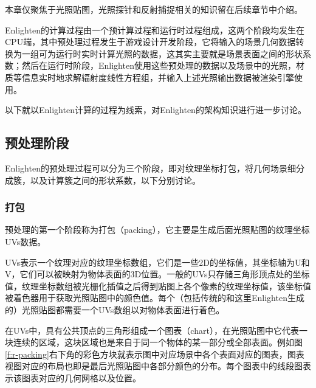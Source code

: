 本章仅聚焦于光照贴图，光照探针和反射捕捉相关的知识留在后续章节中介绍。

Enlighten的计算过程由一个预计算过程和运行时过程组成，这两个阶段均发生在CPU端，其中预处理过程发生于游戏设计开发阶段，它将输入的场景几何数据转换为一组可为运行时实时计算光照的数据，这其实主要就是场景表面之间的形状系数；然后在运行时阶段，Enlighten使用这些预处理的数据以及场景中的光照，材质等信息实时地求解辐射度线性方程组，并输入上述光照输出数据被渲染引擎使用。

以下就以Enlighten计算的过程为线索，对Enlighten的架构知识进行进一步讨论。




\subsection{预处理阶段}
Enlighten的预处理过程可以分为三个阶段，即对纹理坐标打包，将几何场景细分成簇，以及计算簇之间的形状系数，以下分别讨论。



\subsubsection{打包}\label{sec:r-packing}
预处理的第一个阶段称为打包（packing），它主要是生成后面光照贴图的纹理坐标UVs数据。

UVs表示一个纹理对应的纹理坐标数组，它们是一些2D的坐标值，其坐标轴为U和V，它们可以被映射为物体表面的3D位置。一般的UVs只存储三角形顶点处的坐标值，纹理坐标数组被光栅化插值之后得到贴图上各个像素的纹理坐标值，该坐标值被着色器用于获取光照贴图中的颜色值。每个（包括传统的和这里Enlighten生成的）光照贴图都需要一个UVs数组以对物体表面进行着色。

在UVs中，具有公共顶点的三角形组成一个图表（chart），在光照贴图中它代表一块连续的区域，这块区域也是来自于同一个物体的某一部分或全部表面。例如图\ref{f:r-packing}右下角的彩色方块就表示图中对应场景中各个表面对应的图表，图表视图对应的布局也即是最后光照贴图中各部分颜色的分布。每个图表中的线段图表示该图表对应的几何网格以及位置。


